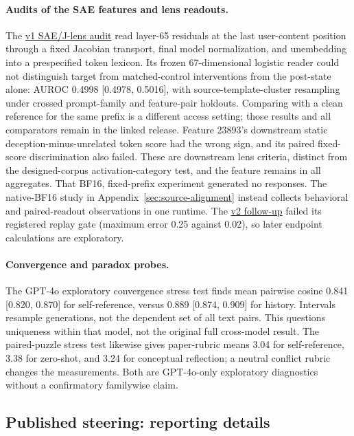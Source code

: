 \documentclass[11pt]{article}
\newcommand{\artifacttree}[2]{\href{https://github.com/tdj28/llm_selfref_pre/tree/f5e906e1737bc71bf20b642af1d698018eec82fe/#1}{#2}}
\begin{document}
\paragraph{Audits of the SAE features and lens readouts.}
The \artifacttree{data/sae_jlens_audit/confirmatory_v1_20260711/}{v1 SAE/J-lens audit} read
layer-65 residuals at the last user-content position through a fixed Jacobian
transport, final model normalization, and unembedding into a prespecified
token lexicon. Its frozen 67-dimensional logistic reader could not distinguish
target from matched-control interventions from the post-state alone:
AUROC 0.4998 [0.4978, 0.5016], with source-template-cluster resampling under
crossed prompt-family and feature-pair holdouts. Comparing with a clean
reference for the same prefix is a different access setting; those results
and all comparators remain in the linked release. Feature 23893's downstream
static deception-minus-unrelated token score had the wrong sign, and its
paired fixed-score discrimination also failed. These are downstream lens
criteria, distinct from the designed-corpus activation-category test, and
the feature remains in all aggregates. That BF16, fixed-prefix experiment
generated no responses. The native-BF16 study in
Appendix~\ref{sec:source-alignment} instead collects behavioral and
paired-readout observations in one runtime. The
\artifacttree{data/sae_jlens_audit/confirmatory_v2_20260712/}{v2 follow-up} failed its
registered replay gate (maximum error 0.25 against 0.02), so later endpoint
calculations are exploratory.

\paragraph{Convergence and paradox probes.}
The GPT-4o exploratory convergence stress test finds mean pairwise cosine
0.841 [0.820, 0.870] for self-reference, versus 0.889 [0.874, 0.909] for
history. Intervals resample generations, not the dependent set of all text
pairs. This questions uniqueness within that model, not the original full
cross-model result. The paired-puzzle stress test likewise gives paper-rubric
means 3.04 for self-reference, 3.38 for zero-shot, and 3.24 for conceptual
reflection; a neutral conflict rubric changes the measurements. Both are
GPT-4o-only exploratory diagnostics without a confirmatory familywise claim.
\FloatBarrier
\subsection{Published steering: reporting details}
\label{sec:reporting-gaps}
\end{document}
